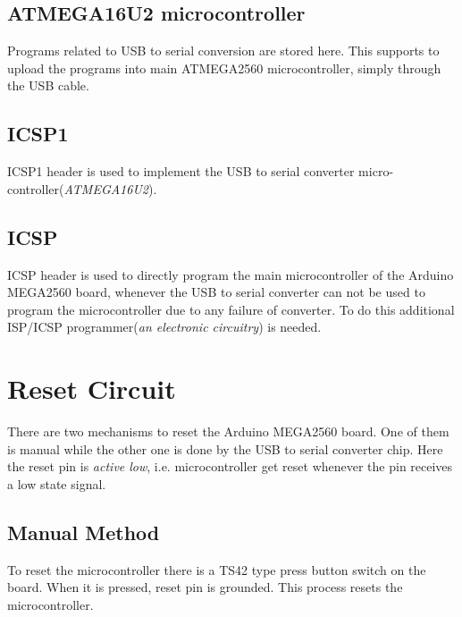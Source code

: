 \documentclass[a4paper,11pt,twocolumn]{article}
\begin{document}
\subsection{ATMEGA16U2 microcontroller}

Programs related to USB to serial conversion are stored here. This supports to upload the programs into  main ATMEGA2560 microcontroller, simply through  the USB cable.

\subsection{ICSP1}

ICSP1 header is used to implement the USB to serial converter micro-controller(\textit{ATMEGA16U2}).

\subsection{ICSP}  

ICSP header is used to directly program the main microcontroller of the Arduino MEGA2560 board, whenever the USB to serial converter can not be used to program the microcontroller due to any failure of converter. To do this additional ISP/ICSP programmer(\textit{an electronic circuitry}) is needed.

\section{Reset Circuit}
There are two mechanisms  to reset the Arduino MEGA2560 board. One of them is manual while the other one is done by the USB to serial converter chip. Here the reset pin is \textit{active low}, i.e. microcontroller get reset whenever the  pin receives a low state signal. 

\subsection{Manual Method}

To reset the microcontroller there is a TS42 type press button switch on the board. When it is pressed, reset pin is grounded. This process resets the microcontroller.
\end{document}
